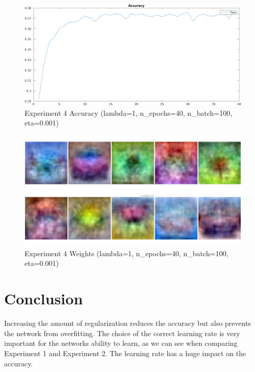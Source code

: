     \begin{figure}[ht]
        \includegraphics[width=\textwidth]{../code/result_pics/lambda=1, n_epochs=40, n_batch=100, eta=.001/accuracy.png}
        \caption{Experiment 4 Accuracy (lambda=1, n\_epochs=40, n\_batch=100, eta=0.001)}
        \label{fig:accuracy4}
    \end{figure}

    \begin{figure}[ht]
        \includegraphics[width=\textwidth]{../code/result_pics/lambda=1, n_epochs=40, n_batch=100, eta=.001/weights.png}
        \caption{Experiment 4 Weights (lambda=1, n\_epochs=40, n\_batch=100, eta=0.001)}
        \label{fig:weights4}
    \end{figure}

\clearpage

\section{Conclusion}
Increasing the amount of regularization reduces the accuracy but also prevents the network from overfitting. The choice of the correct
learning rate is very important for the networks ability to learn, as we can see when comparing Experiment 1 and Experiment 2. The learning rate
has a huge impact on the accuracy.